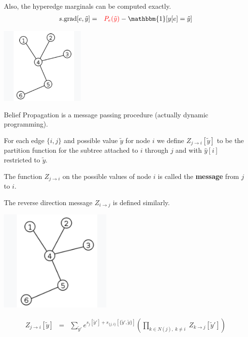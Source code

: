 {\vfill
Also, the hyperedge marginals can be computed exactly.
\begin{eqnarray*}
  s.\mathrm{grad}[e,\tilde{y}] & = & {\color{red} P_e(\tilde{y})} - \mathbbm{1}[y[e] = \tilde{y}]
\end{eqnarray*}



\centerline{\includegraphics[height=1.5in]{../images/Tree}}

\vfill
Belief Propagation is a message passing procedure (actually dynamic programming).

\vfill
For each edge $\{i,j\}$ and possible value $\tilde{y}$ for node $i$ we define {\color{red} $Z_{j \rightarrow i}[\tilde{y}]$}
to be  the partition function for the subtree attached to $i$ through $j$ and
with $\hat{y}[i]$ restricted to $\tilde{y}$.

\vfill
The function $Z_{j \rightarrow i}$ on the possible values of node $i$ is called the {\bf message} from $j$ to $i$.

\vfill
The reverse direction message $Z_{i \rightarrow j}$ is defined similarly.


\centerline{\includegraphics[height=2.0in]{../images/Tree}}

\vfill
\begin{eqnarray*}
  Z_{j\rightarrow i}[\tilde{y}] & = & \sum_{\tilde{y}'}  e^{s_j[\tilde{y}'] + s_{\{j,i\}}[\{\tilde{y}',\tilde{y}\}]}
    \left(\prod_{k \in N(j),\;k \not = i}\;Z_{k\rightarrow j}[\tilde{y}']\right)
\end{eqnarray*}

}
